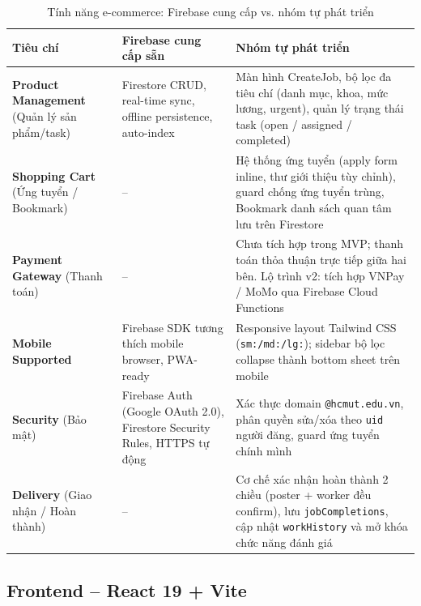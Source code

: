 \begin{table}[H]
\centering
\caption{Tính năng e-commerce: Firebase cung cấp vs. nhóm tự phát triển}
\renewcommand{\arraystretch}{1.2}
\begin{tabularx}{\textwidth}{|p{3.2cm}|p{4.6cm}|X|}
\hline
\rowcolor{emeraldrow}
\textbf{\color{emeraldhead}Tiêu chí} &
\textbf{\color{emeraldhead}Firebase cung cấp sẵn} &
\textbf{\color{emeraldhead}Nhóm tự phát triển} \\
\hline
\textbf{Product Management} (Quản lý sản phẩm/task) &
  Firestore CRUD, real-time sync, offline persistence, auto-index &
  Màn hình CreateJob, bộ lọc đa tiêu chí (danh mục, khoa, mức lương, urgent), quản lý trạng thái task (open / assigned / completed) \\
\hline
\textbf{Shopping Cart} (Ứng tuyển / Bookmark) &
  -- &
  Hệ thống ứng tuyển (apply form inline, thư giới thiệu tùy chỉnh), guard chống ứng tuyển trùng, Bookmark danh sách quan tâm lưu trên Firestore \\
\hline
\textbf{Payment Gateway} (Thanh toán) &
  -- &
  Chưa tích hợp trong MVP; thanh toán thỏa thuận trực tiếp giữa hai bên. Lộ trình v2: tích hợp VNPay / MoMo qua Firebase Cloud Functions \\
\hline
\textbf{Mobile Supported} &
  Firebase SDK tương thích mobile browser, PWA-ready &
  Responsive layout Tailwind CSS (\texttt{sm:/md:/lg:}); sidebar bộ lọc collapse thành bottom sheet trên mobile \\
\hline
\textbf{Security} (Bảo mật) &
  Firebase Auth (Google OAuth 2.0), Firestore Security Rules, HTTPS tự động &
  Xác thực domain \texttt{@hcmut.edu.vn}, phân quyền sửa/xóa theo \texttt{uid} người đăng, guard ứng tuyển chính mình \\
\hline
\textbf{Delivery} (Giao nhận / Hoàn thành) &
  -- &
  Cơ chế xác nhận hoàn thành 2 chiều (poster + worker đều confirm), lưu \texttt{jobCompletions}, cập nhật \texttt{workHistory} và mở khóa chức năng đánh giá \\
\hline
\end{tabularx}
\end{table}

\subsection{Frontend -- React 19 + Vite}

